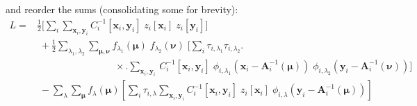 \documentclass[DM,authoryear,toc]{lsstdoc}
\begin{document}
and reorder the sums (consolidating some for brevity):
\begin{align}
L =&
    \frac{1}{2}
        \Bigg[
            \sum_{i}
            \sum_{\bm{x}_i,\bm{y}_i}
                C_i^{-1}[\bm{x}_i, \bm{y}_i]
                \;z_i[\bm{x}_i]
                \;z_i[\bm{y}_i]
        \Bigg]
    \nonumber\\
&\; +
    \frac{1}{2}
        \sum_{\lambda_1,\lambda_2}
        \sum_{\bm{\mu},\bm{\nu}}
        f_{\lambda_1}(\bm{\mu}) \;
        f_{\lambda_2}(\bm{\nu}) \;
        \Bigg[
        \sum_{i}
            \tau_{i,\lambda_1}
            \tau_{i,\lambda_2}
        \Bigg.
    \nonumber\\
&\qquad\qquad\qquad\qquad \times
        \Bigg.
            \sum_{\bm{x}_i,\bm{y}_i}
            \,C_i^{-1}[\bm{x}_i, \bm{y}_i]
            \; \phi_{i,\lambda_1}\!\left(
                    \bm{x}_i - \bm{A}_i^{-1}(\bm{\mu})
            \right)
            \; \phi_{i,\lambda_2}\!\left(
                \bm{y}_i - \bm{A}_i^{-1}(\bm{\nu})
            \right)
        \Bigg]
    \nonumber\\
&\; -
    \sum_{\lambda}
    \sum_{\bm{\mu}}
    f_{\lambda}(\bm{\mu})
    \left[
        \sum_{i}
        \tau_{i,\lambda}
        \sum_{\bm{x}_i,\bm{y}_i}
            C_i^{-1}[\bm{x}_i, \bm{y}_i]
            \; z_i[\bm{x}_i]
            \; \phi_{i,\lambda}\!\left(
                \bm{y}_i - \bm{A}_i^{-1}(\bm{\mu})
            \right)
    \right]
\end{align}
\end{document}
